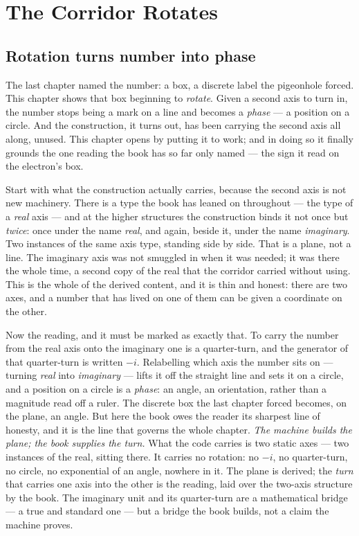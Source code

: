 \chapter{The Corridor Rotates}

\section{Rotation turns number into phase}

The last chapter named the number: a box, a discrete label the pigeonhole forced. This chapter shows that box
beginning to \emph{rotate}. Given a second axis to turn in, the number stops being a mark on a line and becomes a
\emph{phase} --- a position on a circle. And the construction, it turns out, has been carrying the second axis all
along, unused. This chapter opens by putting it to work; and in doing so it finally grounds the one reading the book
has so far only named --- the sign it read on the electron's box.

Start with what the construction actually carries, because the second axis is not new machinery. There is a type the
book has leaned on throughout --- the type of a \emph{real} axis --- and at the higher structures the construction
binds it not once but \emph{twice}: once under the name \emph{real}, and again, beside it, under the name
\emph{imaginary}. Two instances of the same axis type, standing side by side. That is a plane, not a line. The
imaginary axis was not smuggled in when it was needed; it was there the whole time, a second copy of the real that the
corridor carried without using. This is the whole of the derived content, and it is thin and honest: there are two
axes, and a number that has lived on one of them can be given a coordinate on the other.

Now the reading, and it must be marked as exactly that. To carry the number from the real axis onto the imaginary one
is a quarter-turn, and the generator of that quarter-turn is written $-i$. Relabelling which axis the number sits on
--- turning \emph{real} into \emph{imaginary} --- lifts it off the straight line and sets it on a circle, and a
position on a circle is a \emph{phase}: an angle, an orientation, rather than a magnitude read off a ruler. The
discrete box the last chapter forced becomes, on the plane, an angle. But here the book owes the reader its sharpest
line of honesty, and it is the line that governs the whole chapter. \emph{The machine builds the plane; the book
supplies the turn.} What the code carries is two static axes --- two instances of the real, sitting there. It carries
no rotation: no $-i$, no quarter-turn, no circle, no exponential of an angle, nowhere in it. The plane is derived; the
\emph{turn} that carries one axis into the other is the reading, laid over the two-axis structure by the book. The
imaginary unit and its quarter-turn are a mathematical bridge --- a true and standard one --- but a bridge the book
builds, not a claim the machine proves.

